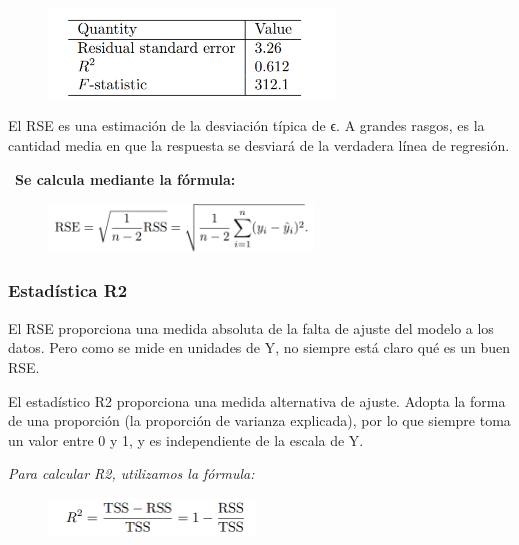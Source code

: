 \documentclass[
  letterpaper,
  DIV=11,
  numbers=noendperiod]{scrartcl}
\begin{document}
\begin{figure}

{\centering \includegraphics[width=3.01042in,height=\textheight]{images/fig13.png}

}

\end{figure}

El RSE es una estimación de la desviación típica de ϵ. A grandes rasgos,
es la cantidad media en que la respuesta se desviará de la verdadera
línea de regresión.

~\textbf{Se calcula mediante la fórmula:}

\begin{figure}

{\centering \includegraphics[width=2.77083in,height=\textheight]{images/fig14.png}

}

\end{figure}

\hypertarget{estaduxedstica-r2}{%
\subsubsection{\texorpdfstring{\textbf{Estadística
R2}}{Estadística R2}}\label{estaduxedstica-r2}}

El RSE proporciona una medida absoluta de la falta de ajuste del modelo
a los datos. Pero como se mide en unidades de Y, no siempre está claro
qué es un buen RSE.

El estadístico R2 proporciona una medida alternativa de ajuste. Adopta
la forma de una proporción (la proporción de varianza explicada), por lo
que siempre toma un valor entre 0 y 1, y es independiente de la escala
de Y.

\emph{Para calcular R2, utilizamos la fórmula:}

\begin{figure}

{\centering \includegraphics[width=2.15625in,height=\textheight]{images/fig15.png}

}

\end{figure}
\end{document}
